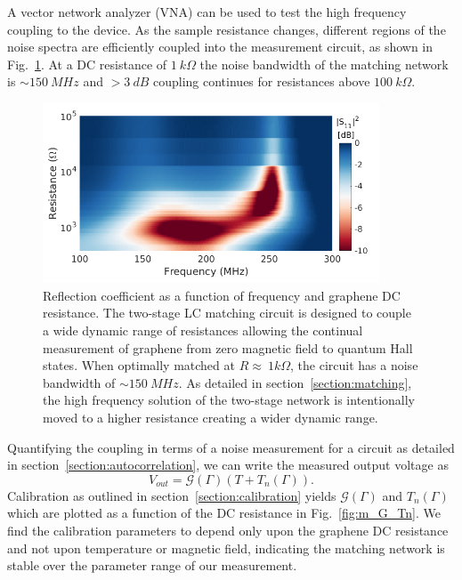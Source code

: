 A vector network analyzer (VNA) can be used to test the high frequency coupling to the device. As the sample resistance changes, different regions of the noise spectra are efficiently coupled into the measurement circuit, as shown in Fig.~\ref{fig:m_S11}. At a DC resistance of $1~k\Omega$ the noise bandwidth of the matching network is ${\sim}150~MHz$ and ${>}3~dB$ coupling continues for resistances above $100~k\Omega$.
\begin{figure}
\centering
\includegraphics[width=100mm]{figures/magneto/S11_plot.png}
\caption{Reflection coefficient as a function of frequency and graphene DC resistance. The two-stage LC matching circuit is designed to couple a wide dynamic range of resistances allowing the continual measurement of graphene from zero magnetic field to quantum Hall states. When optimally matched at $R\approx~1k\Omega$, the circuit has a noise bandwidth of ${\sim}150~MHz$. As detailed in section~\ref{section:matching}, the high frequency solution of the two-stage network is intentionally moved to a higher resistance creating a wider dynamic range.
}
\label{fig:m_S11}
\end{figure}
Quantifying the coupling in terms of a noise measurement for a circuit as detailed in section~\ref{section:autocorrelation}, we can write the measured output voltage as
\begin{equation}\label{eq:Vout_G_Tn}
V_{out} = \mathcal{G}(\Gamma)(T+T_n(\Gamma)).
\end{equation}
Calibration as outlined in section~\ref{section:calibration} yields $\mathcal{G}(\Gamma)$ and $T_n(\Gamma)$ which are plotted as a function of the DC resistance in Fig.~\ref{fig:m_G_Tn}. We find the calibration parameters to depend only upon the graphene DC resistance and not upon temperature or magnetic field, indicating the matching network is stable over the parameter range of our measurement.
